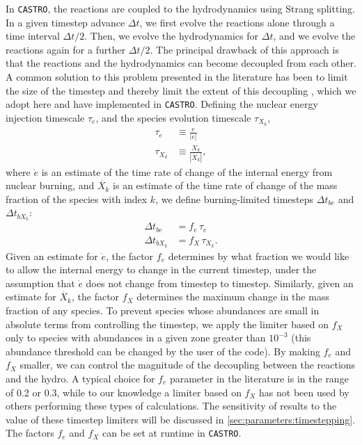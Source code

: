\documentclass[twocolumn,numberedappendix]{../aastex6}
\newcommand{\castro}{\texttt{CASTRO}}
\begin{document}
In \castro, the reactions are coupled to the hydrodynamics using Strang splitting.
In a given timestep advance $\Delta t$, we first evolve the reactions alone through
a time interval $\Delta t / 2$. Then, we evolve the hydrodynamics for $\Delta t$,
and we evolve the reactions again for a further $\Delta t / 2$. The principal
drawback of this approach is that the reactions and the hydrodynamics can become
decoupled from each other. A common solution to this problem presented in
the literature has been to limit the size of the timestep and thereby limit the
extent of this decoupling \citep{raskin:2010,hawley:2012}, which we adopt here 
and have implemented in \castro. Defining the nuclear energy injection timescale 
$\tau_e$, and the species evolution timescale $\tau_{X_k}$,
\begin{align}
  \tau_e &\equiv \frac{e}{|\dot{e}|} \\
  \tau_{X_k} &\equiv \frac{X_k}{|\dot{X_k}|},
\end{align}
where $\dot{e}$ is an estimate of the time rate of change of the internal energy
from nuclear burning, and $\dot{X_k}$ is an estimate of the time rate of change 
of the mass fraction of the species with index $k$, we define burning-limited 
timesteps $\Delta t_{be}$ and $\Delta t_{bX_k}$:
\begin{align}
  \Delta t_{be} &= f_{e}\, \tau_e \label{eq:timestep_e}\\
  \Delta t_{bX_k} &= f_{X}\, \tau_{X_k}. \label{eq:timestep_X}
\end{align}
Given an estimate for $\dot{e}$, the factor $f_{e}$ determines by what 
fraction we would like to allow the internal energy to change
in the current timestep, under the assumption that $\dot{e}$ does not change from
timestep to timestep. Similarly, given an estimate for $\dot{X_k}$, the factor $f_{X}$ 
determines the maximum change in the mass fraction of any species. To prevent species
whose abundances are small in absolute terms from controlling the timestep, we apply
the limiter based on $f_{X}$ only to species with abundances in a given zone greater
than $10^{-3}$ (this abundance threshold can be changed by the user of the code). By making 
$f_{e}$ and $f_{X}$ smaller, we can control the magnitude of the decoupling 
between the reactions and the hydro. A typical choice for $f_e$ parameter in the
literature is in the range of 0.2 or 0.3, while to our knowledge a limiter based on
$f_X$ has not been used by others performing these types of calculations. The sensitivity
of results to the value of these timestep limiters will be discussed in 
\autoref{sec:parameters:timestepping}. The factors $f_{e}$ and $f_{X}$ can be set at runtime in \castro.
\end{document}
